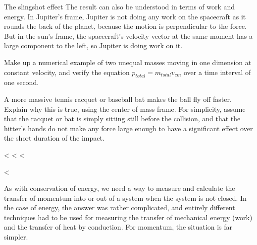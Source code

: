 \begin{eg}{The slingshot effect}
The result can also be understood in terms of work and
energy. In Jupiter's frame, Jupiter is not doing any work on
the spacecraft as it rounds the back of the planet, because
the motion is perpendicular to the force. But in the sun's
frame, the spacecraft's velocity vector at the same moment
has a large component to the left, so Jupiter is doing work on it.
\end{eg}

\startdqs

\begin{dq}
Make up a numerical example of two unequal masses moving
in one dimension at constant velocity, and verify the
equation $p_{total}=m_{total}v_{cm}$ over a time
interval of one second.
\end{dq}

\begin{dq}
A more massive tennis racquet or baseball bat makes the
ball fly off faster. Explain why this is true, using the
center of mass frame. For simplicity, assume that the
racquet or bat is simply sitting still before the collision,
and that the hitter's hands do not make any force large
enough to have a significant effect over the short
duration of the impact.
\end{dq}

<%
<%
<%

  <%

As with conservation of energy, we need a way to measure and
calculate the transfer of momentum into or out of a system
when the system is not closed. In the case of energy, the
answer was rather complicated, and entirely different
techniques had to be used for measuring the transfer of
mechanical energy (work) and the transfer of heat by
conduction. For momentum, the situation is far simpler.

